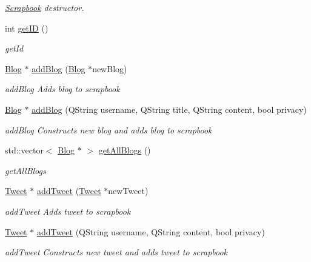 \begin{DoxyCompactItemize}
\begin{DoxyCompactList}\small\item\em \hyperlink{classScrapbook}{Scrapbook} destructor. \end{DoxyCompactList}\item 
int \hyperlink{classScrapbook_afd8c7a71d467c6b82200bb7058db4899}{get\+ID} ()
\begin{DoxyCompactList}\small\item\em get\+Id \end{DoxyCompactList}\item 
\hyperlink{classBlog}{Blog} $\ast$ \hyperlink{classScrapbook_a95795fb9dde39bb70c7715fd5bf94ae4}{add\+Blog} (\hyperlink{classBlog}{Blog} $\ast$new\+Blog)
\begin{DoxyCompactList}\small\item\em add\+Blog Adds blog to scrapbook \end{DoxyCompactList}\item 
\hyperlink{classBlog}{Blog} $\ast$ \hyperlink{classScrapbook_ac73fb4909d68858681afe416f98ffa90}{add\+Blog} (Q\+String username, Q\+String title, Q\+String content, bool privacy)
\begin{DoxyCompactList}\small\item\em add\+Blog Constructs new blog and adds blog to scrapbook \end{DoxyCompactList}\item 
std\+::vector$<$ \hyperlink{classBlog}{Blog} $\ast$ $>$ \hyperlink{classScrapbook_a12af94427c5906543a10cfd24a691cbe}{get\+All\+Blogs} ()
\begin{DoxyCompactList}\small\item\em get\+All\+Blogs \end{DoxyCompactList}\item 
\hyperlink{classTweet}{Tweet} $\ast$ \hyperlink{classScrapbook_a308253a7e3bd93f5ed08a33652e9b5f5}{add\+Tweet} (\hyperlink{classTweet}{Tweet} $\ast$new\+Tweet)
\begin{DoxyCompactList}\small\item\em add\+Tweet Adds tweet to scrapbook \end{DoxyCompactList}\item 
\hyperlink{classTweet}{Tweet} $\ast$ \hyperlink{classScrapbook_aed06bf63ce44d9af1202920b088a0d3f}{add\+Tweet} (Q\+String username, Q\+String content, bool privacy)
\begin{DoxyCompactList}\small\item\em add\+Tweet Constructs new tweet and adds tweet to scrapbook \end{DoxyCompactList}\item 

\end{DoxyCompactItemize}
